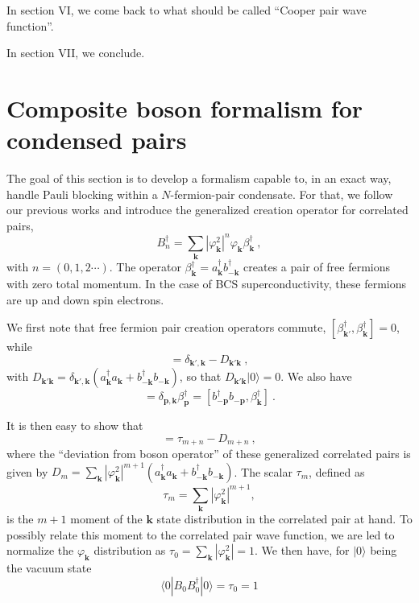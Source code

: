 \documentclass[twocolumn,showpacs]{revtex4}
\def\v#1{\mathbf{#1}}
\begin{document}
In section VI, we come back to what should be called ``Cooper pair wave function''.

In section VII, we conclude.

\section{Composite boson formalism for condensed pairs}

The goal of this section is to develop a formalism capable to, in an exact way, handle Pauli blocking within a $N$-fermion-pair condensate. For that, we follow our previous works \cite{CobosonPhysicsReports, combescotBCS, CobosonBcsRich,motheaten} and introduce the generalized creation operator for correlated pairs,
\begin{equation}
B_n^\dag=\sum_{\v k}|\varphi_{\v k}^2|^n\varphi_{\v k}\beta_{\v k}^\dag\ ,
\end{equation}
with $n=(0,1,2\cdots)$. The operator $\beta_{\v k}^\dag=a_{\v k}^\dag b_{-\v k}^\dag$ creates a pair of free fermions with zero total momentum. In the case of BCS superconductivity, these fermions are up and down spin electrons.

We first note that free fermion pair creation operators commute, $[\beta_{\v k'}^\dag,\beta_{\v k}^\dag]=0$, while
\begin{equation}
[\beta_{\v k'},\beta_{\v k}^\dag]=\delta_{\v k',\v k}-D_{\v k'\v k}\ ,
\end{equation}
with $D_{\v k'\v k}=\delta_{\v k',\v k}(a_{\v k}^\dag a_{\v k}+b_{-\v k}^\dag b_{-\v k})$, so that $D_{\v k'\v k}|0\rangle=0$. We also have
\begin{equation}
[a_{\v p}^\dag a_{\v p},\beta_{\v k}^\dag]=\delta_{\v p,\v k}\beta_{\v p}^\dag=[b_{-\v p}^\dag b_{-\v p},
\beta_{\v k}^\dag]\ .
\end{equation}

It is then easy to show that
\begin{equation}
[B_m,B_n^\dag]=\tau_{m+n}-D_{m+n}\ ,
\end{equation}
where the ``deviation from boson operator'' of these generalized correlated pairs is given by $D_m=\sum_{\v k}|\varphi_{\v k}^2|^{m+1}(a_{\v k}^\dag a_{\v k}+b_{-\v k}^\dag b_{-\v k})$. The scalar $\tau_m$, defined as
\begin{equation}
\tau_m=\sum_{\v k}|\varphi_{\v k}^2|^{m+1},
\end{equation}
is the $m+1$ moment of the $\v k$ state distribution in the correlated pair at hand. To possibly relate this moment to the correlated pair wave function, we are led to normalize the $\varphi_{\v k}$ distribution as $\tau_0=\sum_{\v k}|\varphi_{\v k}^2|=1$. We then have, for $|0\rangle$ being the vacuum state
\begin{equation}
\langle0|B_0^{}B_0^{\dag}|0\rangle=\tau_0=1
\end{equation}
\end{document}
